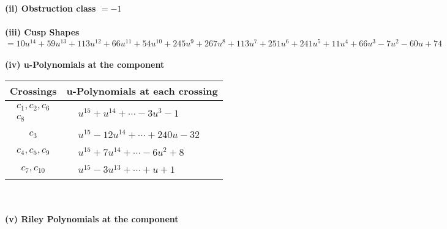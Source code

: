 \documentclass[1p]{elsarticle_modified}
\theoremstyle{definition}
\begin{document}
\flushleft \textbf{(ii) Obstruction class $= -1$}\\~\\
\flushleft \textbf{(iii) Cusp Shapes $= 10 u^{14}+59 u^{13}+113 u^{12}+66 u^{11}+54 u^{10}+245 u^9+267 u^8+113 u^7+251 u^6+241 u^5+11 u^4+66 u^3-7 u^2-60 u+74$}\\~\\
\newpage\renewcommand{\arraystretch}{1}
\flushleft \textbf{(iv) u-Polynomials at the component}\newline \\
\begin{tabular}{m{50pt}|m{274pt}}
Crossings & \hspace{64pt}u-Polynomials at each crossing \\
\hline $$\begin{aligned}c_{1},c_{2},c_{6}\\c_{8}\end{aligned}$$&$\begin{aligned}
&u^{15}+u^{14}+\cdots-3 u^3-1
\end{aligned}$\\
\hline $$\begin{aligned}c_{3}\end{aligned}$$&$\begin{aligned}
&u^{15}-12 u^{14}+\cdots+240 u-32
\end{aligned}$\\
\hline $$\begin{aligned}c_{4},c_{5},c_{9}\end{aligned}$$&$\begin{aligned}
&u^{15}+7 u^{14}+\cdots-6 u^2+8
\end{aligned}$\\
\hline $$\begin{aligned}c_{7},c_{10}\end{aligned}$$&$\begin{aligned}
&u^{15}-3 u^{13}+\cdots+u+1
\end{aligned}$\\
\hline
\end{tabular}\\~\\
\newpage\renewcommand{\arraystretch}{1}
\flushleft \textbf{(v) Riley Polynomials at the component}\newline \\
\end{document}

